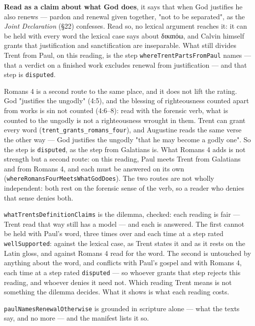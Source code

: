 \documentclass[11pt]{article}
\begin{document}
\textbf{Read as a claim about what God does}, it says that when God justifies he also renews — pardon and renewal given together, "not to be separated", as the \emph{Joint Declaration} (§22) confesses. Read so, no lexical argument reaches it: it can be held with every word the lexical case says about δικαιόω, and Calvin himself grants that justification and sanctification are inseparable. What still divides Trent from Paul, on this reading, is the step \texttt{where\allowbreak{}Trent\allowbreak{}Parts\allowbreak{}From\allowbreak{}Paul} names — that a verdict on a finished work excludes renewal from justification — and that step is \texttt{disputed}.

Romans 4 is a second route to the same place, and it does not lift the rating. God "justifies the ungodly" (4:5), and the blessing of righteousness counted apart from works is sin not counted (4:6–8): read with the forensic verb, what is counted to the ungodly is not a righteousness wrought in them. Trent can grant every word (\texttt{trent\_\allowbreak{}grants\_\allowbreak{}romans\_\allowbreak{}four}), and Augustine reads the same verse the other way — God justifies the ungodly "that he may become a godly one". So the step is \texttt{disputed}, as the step from Galatians is. What Romans 4 adds is not strength but a second route: on this reading, Paul meets Trent from Galatians and from Romans 4, and each must be answered on its own (\texttt{where\allowbreak{}Romans\allowbreak{}Four\allowbreak{}Meets\allowbreak{}What\allowbreak{}God\allowbreak{}Does}). The two routes are not wholly independent: both rest on the forensic sense of the verb, so a reader who denies that sense denies both.

\texttt{what\allowbreak{}Trents\allowbreak{}Definition\allowbreak{}Claims} is the dilemma, checked: each reading is fair — Trent read that way still has a model — and each is answered. The first cannot be held with Paul's word, three times over and each time at a step rated \texttt{well\allowbreak{}Supported}: against the lexical case, as Trent states it and as it rests on the Latin gloss, and against Romans 4 read for the word. The second is untouched by anything about the word, and conflicts with Paul's gospel and with Romans 4, each time at a step rated \texttt{disputed} — so whoever grants that step rejects this reading, and whoever denies it need not. Which reading Trent means is not something the dilemma decides. What it shows is what each reading costs.

\texttt{paul\allowbreak{}Names\allowbreak{}Renewal\allowbreak{}Otherwise} is grounded in scripture alone — what the texts say, and no more — and the manifest lists it so.
\end{document}
